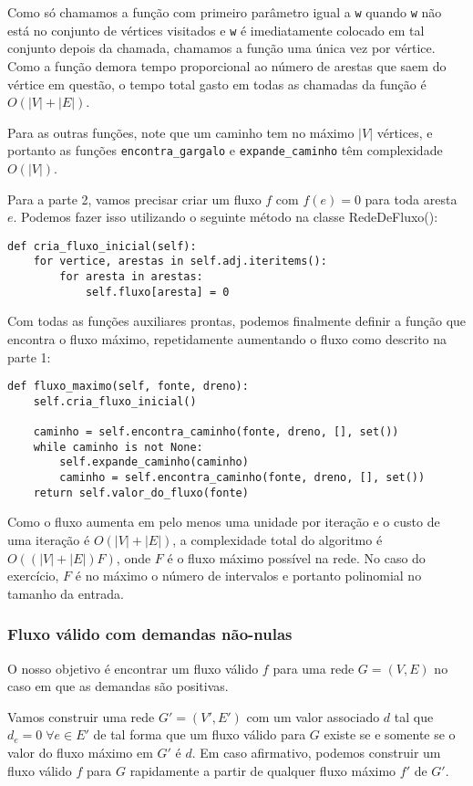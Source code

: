 \documentclass[11pt]{article}
\begin{document}
Como só chamamos a função com primeiro parâmetro igual a \verb~w~ quando
\verb~w~ não está no conjunto de vértices visitados e \verb~w~ é imediatamente
colocado em tal conjunto depois da chamada, chamamos a função uma
única vez por vértice. Como a função demora tempo proporcional ao
número de arestas que saem do vértice em questão, o tempo total gasto
em todas as chamadas da função é $O(|V| + |E|)$.

Para as outras funções, note que um caminho tem no máximo $|V|$
vértices, e portanto as funções \verb~encontra_gargalo~ e \verb~expande_caminho~
têm complexidade $O(|V|)$.

Para a parte 2, vamos precisar criar um fluxo $f$ com $f(e) = 0$ para
toda aresta $e$. Podemos fazer isso utilizando o seguinte método na
classe RedeDeFluxo():
\begin{verbatim}
def cria_fluxo_inicial(self):
    for vertice, arestas in self.adj.iteritems():
        for aresta in arestas:
            self.fluxo[aresta] = 0
\end{verbatim}

Com todas as funções auxiliares prontas, podemos finalmente definir a
função que encontra o fluxo máximo, repetidamente aumentando o fluxo
como descrito na parte 1:
\begin{verbatim}
def fluxo_maximo(self, fonte, dreno):
    self.cria_fluxo_inicial()

    caminho = self.encontra_caminho(fonte, dreno, [], set())
    while caminho is not None:
        self.expande_caminho(caminho)
        caminho = self.encontra_caminho(fonte, dreno, [], set())
    return self.valor_do_fluxo(fonte)
\end{verbatim}

Como o fluxo aumenta em pelo menos uma unidade por iteração e o custo
de uma iteração é $O(|V| + |E|)$, a complexidade total do algoritmo é
$O((|V|+|E|)F)$, onde $F$ é o fluxo máximo possível na rede. No caso
do exercício, $F$ é no máximo o número de intervalos e portanto
polinomial no tamanho da entrada.

\subsubsection{Fluxo válido com demandas não-nulas}
\label{sec-2-4-2}

O nosso objetivo é encontrar um fluxo válido $f$ para uma rede $G =
(V, E)$ no caso em que as demandas são positivas.

Vamos construir uma rede $G' = (V', E')$ com um valor associado $d$
tal que $d_e = 0 \; \forall e \in E'$ de tal forma que um fluxo válido
para $G$ existe se e somente se o valor do fluxo máximo em $G'$ é
$d$. Em caso afirmativo, podemos construir um fluxo válido $f$ para
$G$ rapidamente a partir de qualquer fluxo máximo $f'$ de $G'$.
\end{document}
